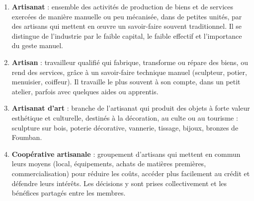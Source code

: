 \documentclass[11pt]{article}
\begin{document}
\begin{corrige}
\begin{enumerate}
\item \textbf{Artisanat} : ensemble des activités de production de biens et de services exercées de manière manuelle ou peu mécanisée, dans de petites unités, par des artisans qui mettent en œuvre un savoir-faire souvent traditionnel. Il se distingue de l'industrie par le faible capital, le faible effectif et l'importance du geste manuel.
\item \textbf{Artisan} : travailleur qualifié qui fabrique, transforme ou répare des biens, ou rend des services, grâce à un savoir-faire technique manuel (sculpteur, potier, menuisier, coiffeur). Il travaille le plus souvent à son compte, dans un petit atelier, parfois avec quelques aides ou apprentis.
\item \textbf{Artisanat d'art} : branche de l'artisanat qui produit des objets à forte valeur esthétique et culturelle, destinés à la décoration, au culte ou au tourisme : sculpture sur bois, poterie décorative, vannerie, tissage, bijoux, bronzes de Foumban.
\item \textbf{Coopérative artisanale} : groupement d'artisans qui mettent en commun leurs moyens (local, équipements, achats de matières premières, commercialisation) pour réduire les coûts, accéder plus facilement au crédit et défendre leurs intérêts. Les décisions y sont prises collectivement et les bénéfices partagés entre les membres.
\end{enumerate}
\end{corrige}
\end{document}

